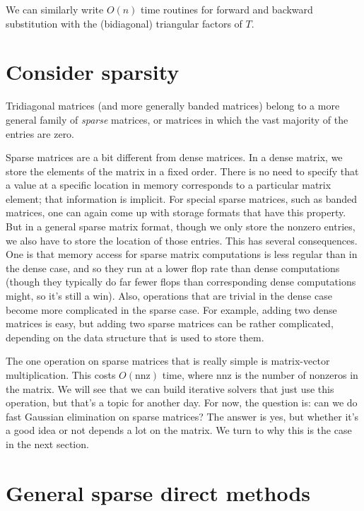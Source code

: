 \documentclass[12pt, leqno]{article}
\begin{document}
We can similarly write $O(n)$ time routines for forward and backward
substitution with the (bidiagonal) triangular factors of $T$.

\section{Consider sparsity}

Tridiagonal matrices (and more generally banded matrices) belong to
a more general family of {\em sparse} matrices, or matrices in which
the vast majority of the entries are zero.

Sparse matrices are a bit different from dense matrices.  In a dense
matrix, we store the elements of the matrix in a fixed order.  There
is no need to specify that a value at a specific location in memory
corresponds to a particular matrix element; that information is
implicit.  For special sparse matrices, such as banded matrices, one
can again come up with storage formats that have this property.  But
in a general sparse matrix format, though we only store the nonzero
entries, we also have to store the location of those entries.  This
has several consequences.  One is that memory access for sparse matrix
computations is less regular than in the dense case, and so they run
at a lower flop rate than dense computations (though they typically do
far fewer flops than corresponding dense computations might, so it's
still a win).  Also, operations that are trivial in the dense case
become more complicated in the sparse case.  For example, adding two
dense matrices is easy, but adding two sparse matrices can be rather
complicated, depending on the data structure that is used to store
them.

The one operation on sparse matrices that is really simple is
matrix-vector multiplication.  This costs $O(\mathrm{nnz})$ time,
where nnz is the number of nonzeros in the matrix.  We will see that
we can build iterative solvers that just use this operation, but
that's a topic for another day.  For now, the question is: can we do
fast Gaussian elimination on sparse matrices?  The answer is yes,
but whether it's a good idea or not depends a lot on the matrix.
We turn to why this is the case in the next section.

\section{General sparse direct methods}
\end{document}
